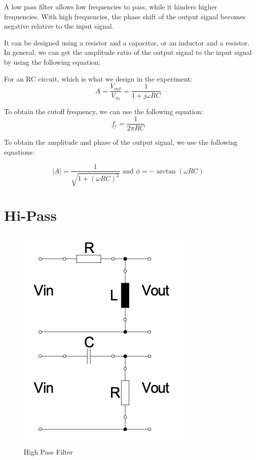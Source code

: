 A low pass filter allows low frequencies to pass, while it hinders higher frequencies. With high frequencies, the phase shift of the output signal becomes negative relative to the input signal.


It can be designed using a resistor and a capacitor, or an inductor and a resistor.
In general, we can get the amplitude ratio of the output signal to the input signal by using the following equation:


For an RC circuit, which is what we design in the experiment:
\begin{equation}
    \underline{A} = \frac{V_{out}}{V_{in}} = \frac{1}{1 + j \omega RC}
\end{equation}


To obtain the cutoff frequency, we can use the following equation:
\begin{equation} \label{eq:1.2}
    \underline{f_c} = \frac{1}{2 \pi RC}
\end{equation}


To obtain the amplitude and phase of the output signal, we use the following equations:

\begin{equation}
    |\underline{A}| = \frac{1}{\sqrt{1 + (\omega RC)^2}} \text{ and } \phi = -\arctan(\omega RC)
\end{equation}

\section{Hi-Pass}
\begin{figure}[H]
    \centering
    \includegraphics[scale=0.75]{images/hi_pass_filter.png}
    \caption{High Pass Filter}
\end{figure}

